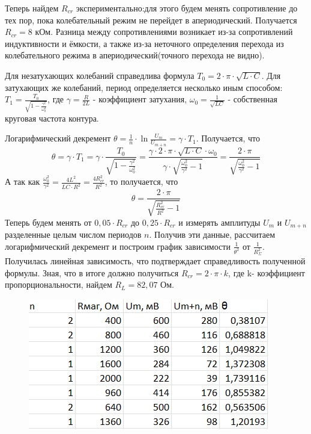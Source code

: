 \documentclass[a4paper,12pt]{article}
\begin{document}
Теперь найдем $R_{cr}$ экспериментально:для этого будем менять сопротивление до тех пор, пока колебательный режим не перейдет в апериодический. Получается $R_{cr} = 8 $ кОм. Разница между сопротивлениями возникает из-за сопротивлений индуктивности и ёмкости, а также из-за неточного определения перехода из колебательного режима в апериодический(точного перехода не видно).

Для незатухающих колебаний справедлива формула $T_0 = 2 \cdot \pi \cdot \sqrt{L \cdot C}$. Для затухающих же колебаний, период определяется несколько иным способом: $T_1 = \frac{T_0}{\sqrt{1-\frac{\gamma^2}{\omega_0^2}}}$, где $\gamma = \frac{R}{2L}$ - коэффициент затухания, $\omega_0 = \frac{1}{\sqrt{LC}}$ - собственная круговая частота контура.

Логарифмический декремент $\theta = \frac{1}{n} \cdot \ln{\frac{U_m}{U_{m+n}}} = \gamma \cdot T_1$. Получается, что
\[\theta = \gamma \cdot T_1 = \gamma \cdot \frac{T_0}{\sqrt{1-\frac{\gamma^2}{\omega_0^2}}} = \frac{\gamma \cdot 2 \cdot \pi \cdot \sqrt{L \cdot C} \cdot \omega_0}{\gamma \cdot \sqrt{\frac{\omega_0^2}{\gamma^2} - 1}} = \frac{2 \cdot \pi}{\sqrt{\frac{\omega_0^2}{\gamma^2} - 1}}\]
А так как $\frac{\omega_0^2}{\gamma^2} = \frac{4L^2}{LC \cdot R^2} = \frac{4R_{cr}^2}{R^2}$, то получается, что 
\[\theta = \frac{2 \cdot \pi}{\sqrt{\frac{R_{cr}^2}{R^2} - 1}} \]
Теперь будем менять от $0,05 \cdot R_{cr}$ до $0,25 \cdot R_{cr}$ и измерять амплитуды $U_m$ и $U_{m+n}$ разделенные целым числом периодов $n$. Получив эти данные, рассчитаем логарифмический декремент и построим график зависимости $\frac{1}{\theta^2}$ от $\frac{1}{R_\Sigma^2}$. Получилась линейная зависимость, что подтверждает справедливость полученной формулы. Зная, что в итоге должно получиться $R_{cr} = 2 \cdot \pi \cdot k$, где k- коэффициент пропорциональности, найдем $R_L = 82,07$ Ом.

\begin{figure}[H]
	\begin{center}
    		\includegraphics[width=.5\textwidth]{tabliza2.3.jpg}
    	\end{center}
\end{figure}
\end{document}
